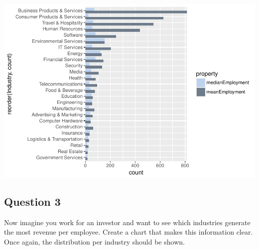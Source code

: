 \documentclass[]{article}
\newenvironment{Shaded}{\begin{snugshade}}{\end{snugshade}}
\newcommand{\KeywordTok}[1]{\textcolor[rgb]{0.13,0.29,0.53}{\textbf{#1}}}
\newcommand{\DataTypeTok}[1]{\textcolor[rgb]{0.13,0.29,0.53}{#1}}
\newcommand{\StringTok}[1]{\textcolor[rgb]{0.31,0.60,0.02}{#1}}
\newcommand{\OperatorTok}[1]{\textcolor[rgb]{0.81,0.36,0.00}{\textbf{#1}}}
\newcommand{\NormalTok}[1]{#1}
\begin{document}
\includegraphics{DATA_608_Project_1_files/figure-latex/unnamed-chunk-9-1.pdf}

\subsection{Question 3}\label{question-3}

Now imagine you work for an investor and want to see which industries
generate the most revenue per employee. Create a chart that makes this
information clear. Once again, the distribution per industry should be
shown.

\begin{Shaded}
\end{Shaded}
\end{document}
